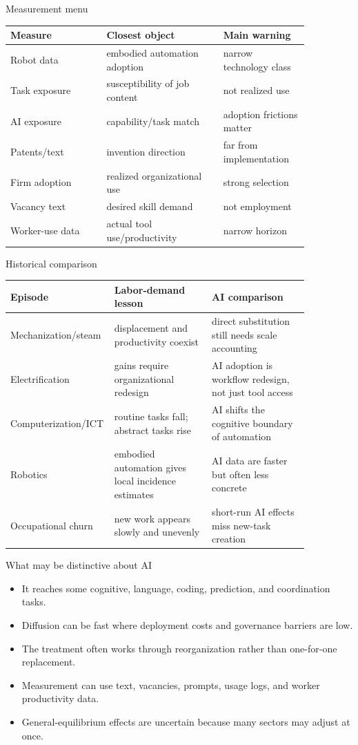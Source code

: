 \documentclass[aspectratio=169,11pt]{beamer}
\begin{document}
\begin{frame}{Measurement menu}
\small
\begin{tabular}{p{0.28\linewidth} p{0.34\linewidth} p{0.24\linewidth}}
\toprule
Measure & Closest object & Main warning \\
\midrule
Robot data & embodied automation adoption & narrow technology class \\
Task exposure & susceptibility of job content & not realized use \\
AI exposure & capability/task match & adoption frictions matter \\
Patents/text & invention direction & far from implementation \\
Firm adoption & realized organizational use & strong selection \\
Vacancy text & desired skill demand & not employment \\
Worker-use data & actual tool use/productivity & narrow horizon \\
\bottomrule
\end{tabular}
\end{frame}

\begin{frame}{Historical comparison}
\small
\begin{tabular}{p{0.22\linewidth} p{0.32\linewidth} p{0.32\linewidth}}
\toprule
Episode & Labor-demand lesson & AI comparison \\
\midrule
Mechanization/steam & displacement and productivity coexist & direct substitution still needs scale accounting \\
Electrification & gains require organizational redesign & AI adoption is workflow redesign, not just tool access \\
Computerization/ICT & routine tasks fall; abstract tasks rise & AI shifts the cognitive boundary of automation \\
Robotics & embodied automation gives local incidence estimates & AI data are faster but often less concrete \\
Occupational churn & new work appears slowly and unevenly & short-run AI effects miss new-task creation \\
\bottomrule
\end{tabular}
\end{frame}

\begin{frame}{What may be distinctive about AI}
\begin{itemize}
    \item It reaches some cognitive, language, coding, prediction, and coordination tasks.
    \item Diffusion can be fast where deployment costs and governance barriers are low.
    \item The treatment often works through reorganization rather than one-for-one replacement.
    \item Measurement can use text, vacancies, prompts, usage logs, and worker productivity data.
    \item General-equilibrium effects are uncertain because many sectors may adjust at once.
\end{itemize}
\end{frame}
\end{document}

